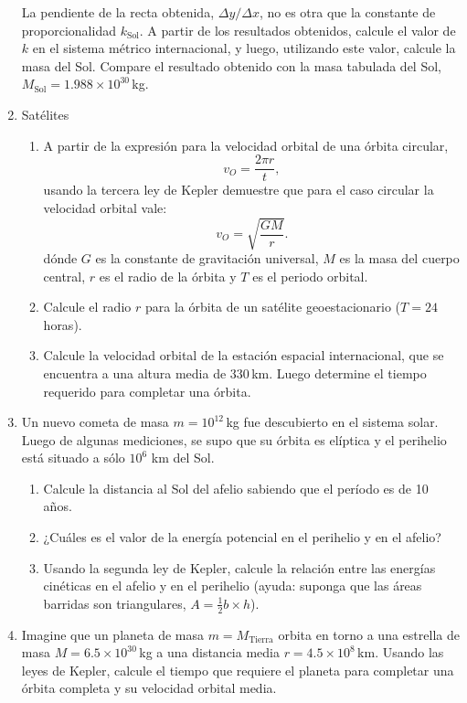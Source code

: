 \documentclass[a4paper,12pt]{article}
\begin{document}
\begin{enumerate}
La pendiente de la recta obtenida, $\Delta y / \Delta x$, no es otra que la constante de proporcionalidad $k_{\mathrm{Sol}}$. A partir de los resultados obtenidos, calcule el valor de $k$ en el sistema métrico internacional, y luego, utilizando este valor, calcule la masa del Sol. Compare el resultado obtenido con la masa tabulada del Sol, $M_\mathrm{Sol}=1.988\times10^{30}$\,kg.

\item Satélites
\begin{enumerate}
\item A partir de la expresión para la velocidad orbital de una órbita circular, 
  \[v_O = \frac{2 \pi r}{t},\]
usando la tercera ley de Kepler demuestre que para el caso circular la velocidad orbital vale: 
\[v_O = \sqrt{\frac{GM}{r}}. \]
dónde $G$ es la constante de gravitación universal, $M$ es la masa del cuerpo central, $r$ es el radio de la órbita y $T$ es el periodo orbital.
\item Calcule el radio $r$ para la órbita de un satélite geoestacionario ($T=24$\,horas).
\item Calcule la velocidad orbital de la estación espacial internacional, que se encuentra a una altura media de $330$\,km. Luego determine el tiempo requerido para completar una órbita.
\end{enumerate}

\item Un nuevo cometa de masa $m=10^{12}$\,kg fue descubierto en el sistema solar.
Luego de algunas mediciones, se supo que su órbita es elíptica y el perihelio
está situado a sólo $10^6$ km del Sol.

\begin{enumerate}
\item Calcule la distancia al Sol del afelio sabiendo que el período es de 10 años.
\item ¿Cuáles es el valor de la energía potencial en el perihelio y en el afelio?
\item Usando la segunda ley de Kepler, calcule la relación entre las energías
cinéticas en el afelio y en el perihelio (ayuda: suponga que las áreas barridas
son triangulares, $A=\frac{1}{2} b \times h$).
\end{enumerate}

\item Imagine que un planeta de masa $m=M_\mathrm{Tierra}$ orbita en torno a una estrella de
masa $M=6.5 \times 10^{30}$\,kg a una distancia media $r=4.5\times10^8$\,km. Usando
las leyes de Kepler, calcule el tiempo que requiere el planeta para completar
una órbita completa y su velocidad orbital media.


\end{enumerate}
\end{document}
